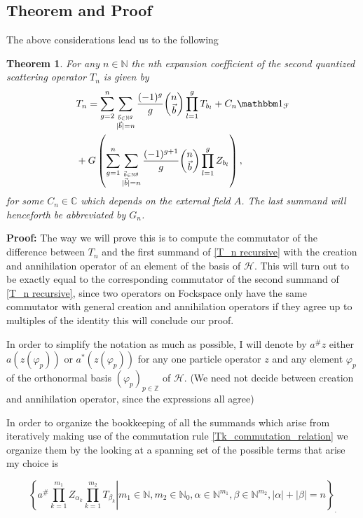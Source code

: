 \documentclass[b5paper,draft,openbib,12pt]{memoir}
\newtheorem{Thm}[Def]{Theorem}
\newcommand{\id}{{\mathbbm 1}}
\begin{document}
\subsection{Theorem and Proof}

The above considerations lead us to the following

\begin{Thm}\label{thm: T_n recursive}
For any \(n\in\mathbb{N}\) the nth expansion coefficient of the second quantized scattering operator \(T_n\) is given by
\begin{align}\notag
&T_n = \sum_{g=2}^n \sum_{\stackrel{\vec{b}\in\mathbb{N}^g}{|\vec{b}|=n}}\frac{(-1)^g}{g} 
\binom{n}{\vec{b}} \prod_{l=1}^g T_{b_l} + C_n \id_{\mathcal{F}} \\ \label{T_n recursive}
&+ G\left( \sum_{g=1}^n \sum_{\stackrel{\vec{b}\in\mathbb{N}^g}{|\vec{b}|=n}}\frac{(-1)^{g+1}}{g} 
\binom{n}{\vec{b}} \prod_{l=1}^g Z_{b_l}  \right),
\end{align}
for some \(C_n\in \mathbb{C}\) which depends on the external field \(A\). The last summand will henceforth
be abbreviated by \(G_n\).
\end{Thm}

\textbf{Proof:} The way we will prove this is to compute the commutator of the difference between \(T_n\) and
the first summand of \eqref{T_n recursive} with the creation and annihilation operator of an element of the
basis of \(\mathcal{H}\). This will turn out to be exactly equal
to the corresponding commutator
of the second summand of \eqref{T_n recursive}, since two operators on Fockspace only
have the same commutator with general creation and annihilation operators if they
agree up to multiples of the identity this will conclude our proof. 

 In order to simplify the notation as much as possible, 
I will denote by \(a^\# z\) either \(a(z(\varphi_p))\) or
 \(a^*(z(\varphi_p))\) for any one particle operator \(z\) and any element
 \(\varphi_p\) of the orthonormal basis \((\varphi_p)_{p\in\mathbb{Z}}\) of
 \(\mathcal{H}\). (We need not decide between creation and annihilation 
 operator, since the expressions all agree)
 
In order to organize the bookkeeping of all the summands which arise from iteratively
making use of the commutation rule \eqref{Tk_commutation_relation} we organize them 
by the looking at a spanning set of the possible terms that arise my choice is

\begin{equation}\label{combinatorics span}
\left\{ \left. a^\# \prod_{k=1}^{m_1} Z_{\alpha_k} \prod_{k=1}^{m_2}T_{\beta_k} \right|
m_1\in\mathbb{N},m_2\in\mathbb{N}_0, \alpha\in \mathbb{N}^{m_1}, 
\beta \in \mathbb{N}^{m_2}, |\alpha|+|\beta|=n\right\}_.
\end{equation}
\end{document}
